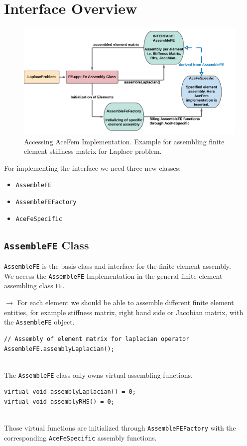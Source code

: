 \chapter{Interface Overview}
\begin{figure}[H]
\centering
  \includegraphics[width=1\textwidth , height=0.5\textwidth]{AceFe.pdf}
 \caption{Accessing AceFem Implementation. Example for assembling finite element stiffness matrix for Laplace problem.}
\end{figure}

For implementing the interface we need three new classes:
\begin{itemize}
\item \texttt{AssembleFE}
\item \texttt{AssembleFEFactory}
\item \texttt{AceFeSpecific}
\end{itemize}

\section{\texttt{AssembleFE} Class}
\texttt{AssembleFE} is the basis class and interface for the finite element assembly.\\
We access the \texttt{AssembleFE} Implementation in the general finite element assembling class \texttt{FE}.

$\rightarrow$ For each element we should be able to assemble different finite element entities, for example stiffness matrix, right hand side or Jacobian matrix, with the \texttt{AssembleFE} object.
\begin{lstlisting}
// Assembly of element matrix for laplacian operator
AssembleFE.assemblyLaplacian(); 
\end{lstlisting}
~~\\
The \texttt{AssembleFE} class only owns virtual assembling functions.
\begin{lstlisting}
virtual void assemblyLaplacian() = 0;
virtual void assemblyRHS() = 0;
\end{lstlisting}
~~\\
Those virtual functions are initialized through \texttt{AssembleFEFactory} with the corresponding \texttt{AceFeSpecific} assembly functions.

